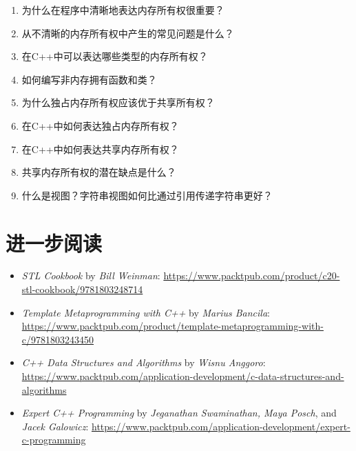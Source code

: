 \begin{enumerate}
\item
  为什么在程序中清晰地表达内存所有权很重要？
\item
  从不清晰的内存所有权中产生的常见问题是什么？
\item
  在C++中可以表达哪些类型的内存所有权？
\item
  如何编写非内存拥有函数和类？
\item
  为什么独占内存所有权应该优于共享所有权？
\item
  在C++中如何表达独占内存所有权？
\item
  在C++中如何表达共享内存所有权？
\item
  共享内存所有权的潜在缺点是什么？
\item
  什么是视图？字符串视图如何比通过引用传递字符串更好？
\end{enumerate}

\section{进一步阅读}

\begin{itemize}
\item
  \emph{\cpp[20]  STL Cookbook} by \emph{Bill Weinman}: \url{https://www.packtpub.com/product/c20-stl-cookbook/9781803248714}
\item
  \emph{Template Metaprogramming with C++} by \emph{Marius Bancila}: \url{https://www.packtpub.com/product/template-metaprogramming-with-c/9781803243450}
\item
  \emph{C++ Data Structures and Algorithms} by \emph{Wisnu Anggoro}: \url{https://www.packtpub.com/application-development/c-data-structures-and-algorithms}
\item
  \emph{Expert C++ Programming} by \emph{Jeganathan Swaminathan, Maya Posch}, and \emph{Jacek Galowicz}: \url{https://www.packtpub.com/application-development/expert-c-programming}
\end{itemize}